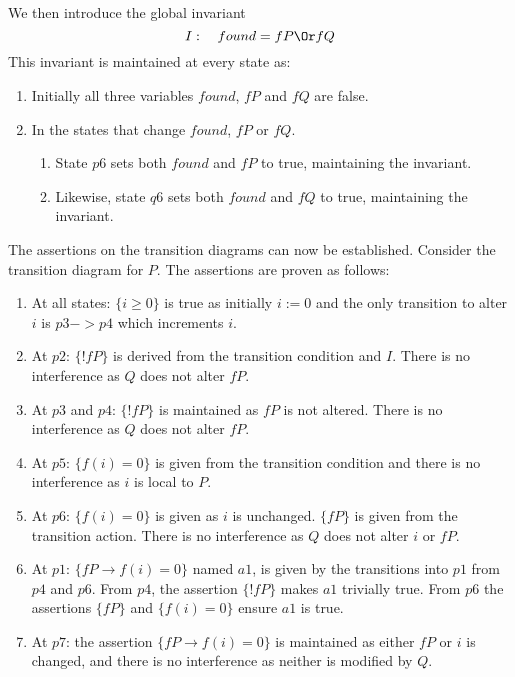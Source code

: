 \documentclass[12pt,a4paper]{scrartcl}
\begin{document}
We then introduce the global invariant
\begin{equation}
    I: \quad found = fP \Or fQ
\label{eq:og-invariant}
\end{equation}
This invariant is maintained at every state as:
\begin{enumerate}
    \item Initially all three variables $found$, $fP$ and $fQ$ are false.
    \item In the states that change $found$, $fP$ or $fQ$.
    \begin{enumerate}
        \item State $p6$ sets both $found$ and $fP$ to true, maintaining the invariant.
        \item Likewise, state $q6$ sets both $found$ and $fQ$ to true, maintaining the invariant.
    \end{enumerate}
\end{enumerate}

The assertions on the transition diagrams can now be established. Consider the transition diagram for $P$. The assertions are proven as follows:
\begin{enumerate}
    \item At all states: $\{i\ge0\}$ is true as initially $i:=0$ and the only transition to alter $i$ is $p3 -> p4$ which increments $i$.
    \item At $p2$: $\{!fP\}$ is derived from the transition condition and $I$. There is no interference as $Q$ does not alter $fP$.
    \item At $p3$ and $p4$: $\{!fP\}$ is maintained as $fP$ is not altered. There is no interference as $Q$ does not alter $fP$.
    \item At $p5$: $\{f(i)=0\}$ is given from the transition condition and there is no interference as $i$ is local to $P$.
    \item At $p6$: $\{f(i)=0\}$ is given as $i$ is unchanged. $\{fP\}$ is given from the transition action. There is no interference as $Q$ does not alter $i$ or $fP$.
    \item At $p1$: $\{fP \rightarrow f(i)=0\}$ named $a1$, is given by the transitions into $p1$ from $p4$ and $p6$.
          From $p4$, the assertion $\{!fP\}$ makes $a1$ trivially true.
          From $p6$ the assertions $\{fP\}$ and $\{f(i)=0\}$ ensure $a1$ is true.
    \item At $p7$: the assertion $\{fP \rightarrow f(i)=0\}$ is maintained as either $fP$ or $i$ is changed, and there is no interference as neither is modified by $Q$.
\end{enumerate}
\end{document}

